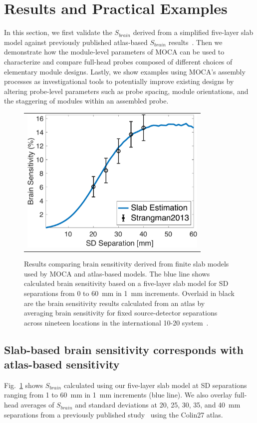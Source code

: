 \section{Results and Practical Examples}
\label{sec:results}
In this section, we first validate the $S_{brain}$ derived from a simplified five-layer slab model against previously published atlas-based $S_{brain}$ results~\cite{Strangman2013}. Then we demonstrate how the module-level parameters of MOCA can be used to characterize and compare full-head probes composed of different choices of elementary module designs. Lastly, we show examples using MOCA's assembly processes as investigational tools to potentially improve existing designs by altering probe-level parameters such as probe spacing, module orientations, and the staggering of modules within an assembled probe.

\begin{figure}
    \begin{center}
    \begin{tabular}{c}
    \includegraphics[width=9cm]{fig/moca/Fig_3.pdf}
    \end{tabular}
    \end{center}
    \caption {Results comparing brain sensitivity derived from finite slab models used by MOCA and atlas-based models. The blue line shows calculated brain sensitivity based on a five-layer slab model for SD separations from 0 to 60~mm in 1~mm increments. Overlaid in black are the brain sensitivity results calculated from an atlas by averaging brain sensitivity for fixed source-detector separations across nineteen locations in the international 10-20 system~\cite{Strangman2013}. } 
    \label{fig:BScomparison}
\end{figure} 

\subsection{Slab-based brain sensitivity corresponds with atlas-based sensitivity}
Fig.~\ref{fig:BScomparison} shows $S_{brain}$ calculated using our five-layer slab model at SD separations ranging from 1 to 60~mm in 1~mm increments (blue line). We also overlay full-head averages of $S_{brain}$ and standard deviations at 20, 25, 30, 35, and 40~mm separations from a previously published study~\cite{Strangman2013} using the Colin27 atlas.

